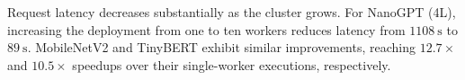 Request latency decreases substantially as the cluster grows. For NanoGPT
(4L), increasing the deployment from one to ten workers reduces latency from
\(\qty[quantity-product = {}]{1108}{\second}\) to
\(\qty[quantity-product = {}]{89}{\second}\). MobileNetV2 and TinyBERT
exhibit similar improvements, reaching \(\num{12.7}\times\) and
\(\num{10.5}\times\) speedups over their single-worker executions,
respectively.

 







